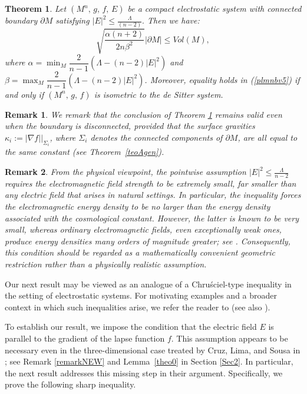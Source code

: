 \documentclass{amsart}
\newtheorem{theoremletter}{Theorem}
\newtheorem{remark}{Remark}
\numberwithin{equation}{section}
\begin{document}
\begin{theoremletter}
\label{main}
Let $(M^n,\, g,\, f,\,E)$ be a compact electrostatic system with connected boundary $\partial M$ satisfying $|E|^2\leq\frac{\Lambda}{(n-2)}.$ Then we have:
\begin{equation}
\label{plmnbv5}
\sqrt{\frac{\alpha(n+2)}{2n\beta^{2}}}|\partial M|\leq  Vol(M),
\end{equation}
where $ \alpha = \min_{M}\dfrac{2}{n - 1}\left(\Lambda - (n - 2)|E|^2\right)$ and $ \beta = \max_{M}\dfrac{2}{n - 1}\left(\Lambda - (n - 2)|E|^2\right)$. Moreover, equality holds in (\ref{plmnbv5}) if and only if $(M^n,\, g,\, f)$ is isometric to the de Sitter system.
\end{theoremletter}




\begin{remark}
We remark that the conclusion of Theorem \ref{main} remains valid even when the boundary is disconnected, provided that the surface gravities \( \kappa_i := |\nabla f| \big|_{\Sigma_i} \), where \( \Sigma_i \) denotes the connected components of \( \partial M \), are all equal to the same constant (see Theorem~\ref{teoAgen}).
\end{remark}
	
	
\begin{remark}
\label{remNew}
From the physical viewpoint, the pointwise assumption $|E|^2 \leq \frac{\Lambda}{n-2}$ requires the electromagnetic field strength to be extremely small, far smaller than any electric field that arises in natural settings. In particular, the inequality forces the electromagnetic energy density to be no larger than the energy density associated with the cosmological constant. However, the latter is known to be very small, whereas ordinary electromagnetic fields, even exceptionally weak ones, produce energy densities many orders of magnitude greater; see \cite{Barrow}. Consequently, this condition should be regarded as a mathematically convenient geometric restriction rather than a physically realistic assumption.
\end{remark}



Our next result may be viewed as an analogue of a Chru\'sciel-type inequality in the setting of electrostatic systems. For motivating examples and a broader context in which such inequalities arise, we refer the reader to \cite[p.~13]{Crus} (see also \cite{HMR}). 

To establish our result, we impose the condition that the electric field \( E \) is  parallel to the gradient of the lapse function \( f \). This assumption appears to be necessary even in the three-dimensional case treated by Cruz, Lima, and Sousa in \cite[Theorem E]{tiarlos}; see Remark \ref{remarkNEW} and Lemma~\ref{theo0} in Section \ref{Sec2}. In particular, the next result addresses this missing step in their argument. Specifically, we prove the following sharp inequality.
\end{document}
